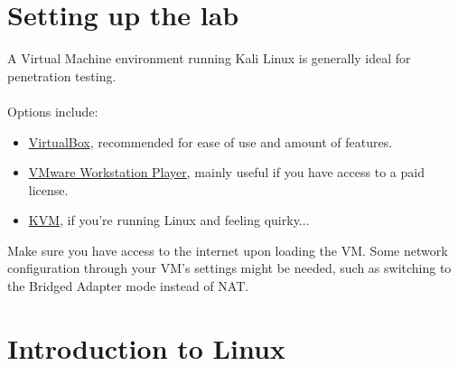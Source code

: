 \documentclass[a4paper,11pt]{article}
\begin{document}
\section{Setting up the lab}

A Virtual Machine environment running Kali Linux is generally ideal for penetration testing.
\\
\\
Options include:
\begin{multicols}{2}
\begin{itemize}
    \item \href{https://www.virtualbox.org/wiki/Downloads}{VirtualBox}, recommended for ease of use and amount of features.
    \item \href{https://www.vmware.com/products/workstation-player/workstation-player-evaluation.html}{VMware Workstation Player}, mainly useful if you have access to a paid license.
    \item \href{https://www.linux-kvm.org/page/Main_Page}{KVM}, if you're running Linux and feeling quirky... 
\end{itemize}
\end{multicols}

Make sure you have access to the internet upon loading the VM. Some network configuration through your VM's settings might be needed, such as switching to the Bridged Adapter mode instead of NAT.

\section{Introduction to Linux}
\end{document}
